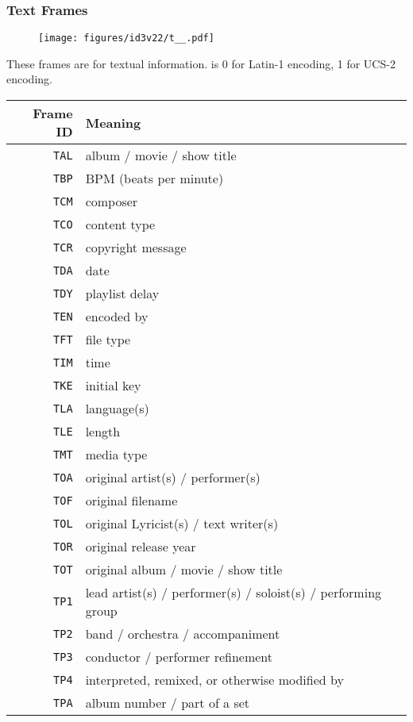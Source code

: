 \clearpage

\subsubsection{Text Frames}
\begin{figure}[h]
\texttt{[image: figures/id3v22/t\_\_.pdf]}
\end{figure}
These frames are for textual information.
 is 0 for Latin-1 encoding, 1 for UCS-2 encoding.
\begin{table}[h]
{
\begin{tabular}{|r|l|}
\hline
Frame ID & Meaning \\
\hline
\texttt{TAL} & album / movie / show title \\
\texttt{TBP} & BPM (beats per minute) \\
\texttt{TCM} & composer \\
\texttt{TCO} & content type \\
\texttt{TCR} & copyright message \\
\texttt{TDA} & date \\
\texttt{TDY} & playlist delay \\
\texttt{TEN} & encoded by \\
\texttt{TFT} & file type \\
\texttt{TIM} & time \\
\texttt{TKE} & initial key \\
\texttt{TLA} & language(s) \\
\texttt{TLE} & length \\
\texttt{TMT} & media type \\
\texttt{TOA} & original artist(s) / performer(s) \\
\texttt{TOF} & original filename \\
\texttt{TOL} & original Lyricist(s) / text writer(s) \\
\texttt{TOR} & original release year \\
\texttt{TOT} & original album / movie / show title \\
\texttt{TP1} & lead artist(s) / performer(s) / soloist(s) / performing group \\
\texttt{TP2} & band / orchestra / accompaniment \\
\texttt{TP3} & conductor / performer refinement \\
\texttt{TP4} & interpreted, remixed, or otherwise modified by \\
\texttt{TPA} & album number / part of a set \\

\end{tabular}}
\end{table}
